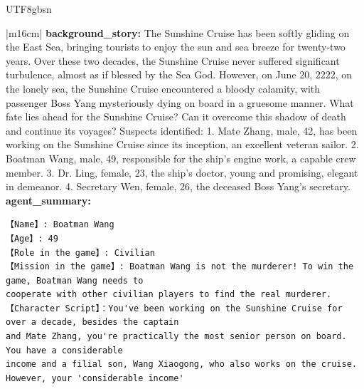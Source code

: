\documentclass[11pt]{article}
\begin{document}
{\begin{CJK}{UTF8}{gbsn}
\begin{table}[ht!]
\begin{tabular}{|m{16cm}|}
\textbf{   background\_story:} \small The Sunshine Cruise has been softly gliding on the East Sea, bringing tourists to enjoy the sun and sea breeze for twenty-two years. Over these two decades, the Sunshine Cruise never suffered significant turbulence, almost as if blessed by the Sea God. However, on June 20, 2222, on the lonely sea, the Sunshine Cruise encountered a bloody calamity, with passenger Boss Yang mysteriously dying on board in a gruesome manner. What fate lies ahead for the Sunshine Cruise? Can it overcome this shadow of death and continue its voyages? Suspects identified: 1. Mate Zhang, male, 42, has been working on the Sunshine Cruise since its inception, an excellent veteran sailor. 2. Boatman Wang, male, 49, responsible for the ship's engine work, a capable crew member. 3. Dr. Ling, female, 23, the ship's doctor, young and promising, elegant in demeanor. 4. Secretary Wen, female, 26, the deceased Boss Yang's secretary.  \\
 \textbf{   agent\_summary:} \\
\begin{minipage}[t]{\linewidth}
\small\begin{verbatim}
【Name】: Boatman Wang
【Age】: 49
【Role in the game】: Civilian
【Mission in the game】: Boatman Wang is not the murderer! To win the game, Boatman Wang needs to
cooperate with other civilian players to find the real murderer.
【Character Script】：You've been working on the Sunshine Cruise for over a decade, besides the captain 
and Mate Zhang, you're practically the most senior person on board. You have a considerable
income and a filial son, Wang Xiaogong, who also works on the cruise. However, your 'considerable income'

\end{verbatim}
\end{minipage}
\end{tabular}
\end{table}
\end{CJK}}
\end{document}
